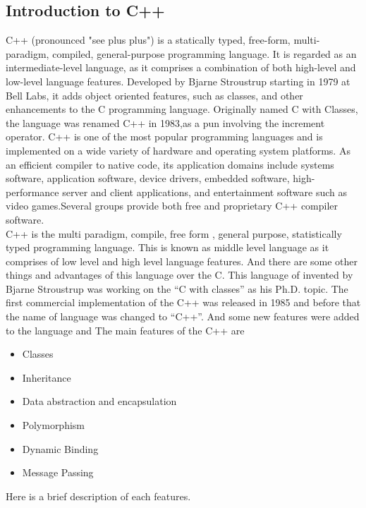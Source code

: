 
\subsection{Introduction to C++}
	C++ (pronounced "see plus plus") is a statically typed, free-form, multi-paradigm, compiled, general-purpose programming language. It is regarded as an intermediate-level language, as it comprises a combination of both high-level and low-level language features. Developed by Bjarne Stroustrup starting in 1979 at Bell Labs, it adds object oriented features, such as classes, and other enhancements to the C programming language. Originally named C with Classes, the language was renamed C++ in 1983,as a pun involving the increment operator.\newline
	C++ is one of the most popular programming languages and is implemented on a wide variety of hardware and operating system platforms. As an efficient compiler to native code, its application domains include systems software, application software, device drivers, embedded software, high-performance server and client applications, and entertainment software such as video games.Several groups provide both free and proprietary C++ compiler software.\\
C++ is the multi paradigm, compile, free form , general purpose, statistically typed programming language. This is known as middle 		level language as it comprises of low level and high level language features.
And there are some other things and advantages of this language over the C. This language of invented by Bjarne Stroustrup was working 	on the “C with classes” as his Ph.D.  topic. The first commercial implementation of the C++ was released in 1985 and before that the 		name of language was changed to “C++”. And some new features were added to the language and The main features of the C++ are
\begin{itemize}
\item Classes
\item Inheritance
\item Data abstraction and encapsulation
\item Polymorphism
\item Dynamic Binding
\item Message Passing
\end{itemize}
Here is a brief description of each features.

